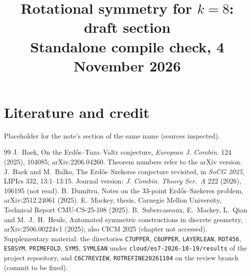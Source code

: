 \documentclass[10pt]{article}
\title{Rotational symmetry for $k=8$: draft section\\[3pt]\large Standalone compile check, 4 November 2026}
\author{}
\date{}
\theoremstyle{definition}
\theoremstyle{remark}
\newcommand{\dirn}[1]{{\upshape\nolinkurl{#1}}}
\begin{document}
\maketitle



\section{Literature and credit}\label{sec:lit}
Placeholder for the note's section of the same name (sources inspected).

\begin{thebibliography}{99}\footnotesize
\setlength{\itemsep}{0pt}\setlength{\parsep}{0pt}
 J.~Baek, On the Erd\H{o}s--Tuza--Valtr conjecture, \emph{European J. Combin.} 124 (2025), 104085;
arXiv:2206.04260. Theorem numbers refer to the arXiv version.
 J.~Baek and M.~Balko, The Erd\H{o}s--Szekeres conjecture revisited, in \emph{SoCG 2025}, LIPIcs 332,
13:1--13:15. Journal version: \emph{J. Combin. Theory Ser.~A} 222 (2026), 106195 (not read).
 B.~Dumitru, Notes on the 33-point Erd\H{o}s--Szekeres problem, arXiv:2512.24061 (2025).
 E.~Mackey, thesis, Carnegie Mellon University, Technical Report CMU-CS-25-108 (2025).
 B.~Subercaseaux, E.~Mackey, L.~Qian and M.~J.~H.~Heule, Automated symmetric constructions in discrete
geometry, arXiv:2506.00224v1 (2025); also CICM 2025 (chapter not accessed).
 Supplementary material: the directories \dirn{C7UPPER}, \dirn{C6UPPER}, \dirn{LAYERLEAN}, \dirn{ROT456},
\dirn{ES8SYM}, \dirn{PRIMEFOLD}, \dirn{SYM5}, \dirn{SYMLEAN} under \dirn{cloud/es7-2026-10-19/results} of the project
repository, and \dirn{C6C7REVIEW}, \dirn{ROTREFINE20261104} on the review branch (commit to be fixed).
\end{thebibliography}
\end{document}
